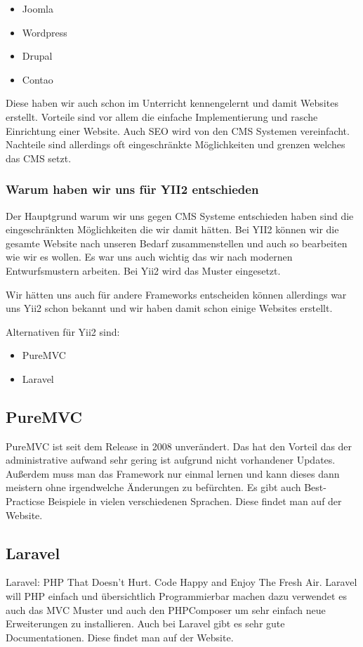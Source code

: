 \begin{itemize}
\item Joomla
\item Wordpress
\item Drupal
\item Contao
\end{itemize}

Diese haben wir auch schon im Unterricht kennengelernt und damit Websites erstellt. Vorteile sind vor allem die einfache Implementierung und rasche Einrichtung einer Website. Auch SEO wird von den CMS Systemen vereinfacht. Nachteile sind allerdings oft eingeschränkte Möglichkeiten und grenzen welches das CMS setzt.

\subsubsection{Warum haben wir uns für YII2 entschieden}

Der Hauptgrund warum wir uns gegen CMS Systeme entschieden haben sind die eingeschränkten Möglichkeiten die wir damit hätten. Bei YII2 können wir die gesamte Website nach unseren Bedarf zusammenstellen und auch so bearbeiten wie wir es wollen. Es war uns auch wichtig das wir nach modernen Entwurfsmustern arbeiten. Bei Yii2 wird das  Muster eingesetzt.

Wir hätten uns auch für andere Frameworks entscheiden können allerdings war uns Yii2 schon bekannt und wir haben damit schon einige Websites erstellt.

Alternativen für Yii2 sind:

\begin{itemize}
	\item PureMVC
	\item Laravel
\end{itemize}

\subsection{PureMVC}
PureMVC ist seit dem Release in 2008 unverändert. Das hat den Vorteil das der administrative aufwand sehr gering ist aufgrund nicht vorhandener Updates. Außerdem muss man das Framework nur einmal lernen und kann dieses dann meistern ohne irgendwelche Änderungen zu befürchten.
Es gibt auch Best-Practicse Beispiele in vielen verschiedenen Sprachen. Diese findet man auf der Website. \cite{Pure_MVC}

\subsection{Laravel}
Laravel: PHP That Doesn’t Hurt. Code Happy and Enjoy The Fresh Air.
Laravel will PHP einfach und übersichtlich Programmierbar machen dazu verwendet es auch das MVC Muster und auch den PHPComposer um sehr einfach neue Erweiterungen zu installieren. Auch bei Laravel gibt es sehr gute Documentationen. Diese findet man auf der Website. \cite{laravel}


